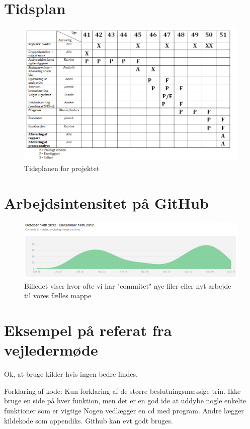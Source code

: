 \section{Tidsplan}
\label{bilag1}
\begin{figure}[H]
\includegraphics[width=\textwidth]{Indhold/tidsplan.png}
\caption {Tidsplanen for projektet}
\label {tidsplan}
\end{figure}

\section{Arbejdsintensitet på GitHub}
\label{bilag2}
\begin{figure}[H]
\includegraphics[width=\textwidth]{Indhold/arbejdsintensitet.png}
\caption {Billedet viser hvor ofte vi har "commitet" nye filer eller nyt arbejde til vores fælles mappe}
\label {arbejde}
\end{figure}


\section{Eksempel på referat fra vejledermøde}

Ok, at bruge kilder hvis ingen bedre findes.

Forklaring af kode:
Kun forklaring af de større beslutningsmæssige trin.
Ikke bruge en side på hver funktion, men det er en god ide at uddybe nogle enkelte funktioner som er vigtige
Nogen vedlægger en cd med program. Andre lægger kildekode som appendiks. Github kan evt godt bruges.

